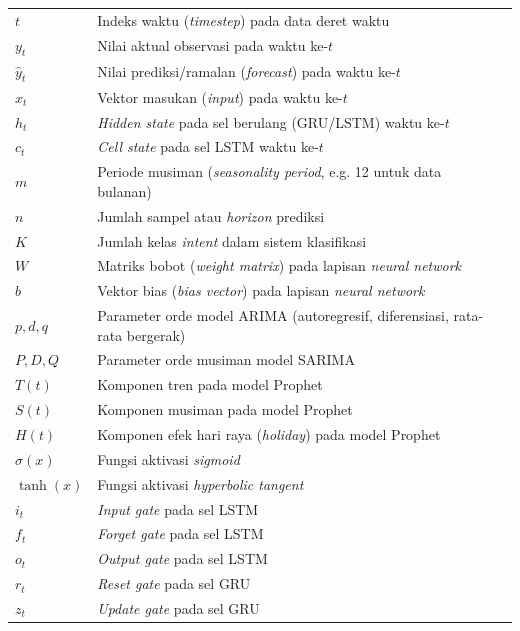 \begin{longtable}{@{} l >{\raggedright\arraybackslash}p{6.5cm} c @{}}
$t$ & Indeks waktu (\textit{timestep}) pada data deret waktu & \pageref{sym:t} \\
$y_t$ & Nilai aktual observasi pada waktu ke-$t$ & \pageref{sym:yt} \\
$\hat{y}_t$ & Nilai prediksi/ramalan (\textit{forecast}) pada waktu ke-$t$ & \pageref{sym:yhat} \\
$x_t$ & Vektor masukan (\textit{input}) pada waktu ke-$t$ & \pageref{sym:xt} \\
$h_t$ & \textit{Hidden state} pada sel berulang (GRU/LSTM) waktu ke-$t$ & \pageref{sym:ht} \\
$c_t$ & \textit{Cell state} pada sel LSTM waktu ke-$t$ & \pageref{sym:ct} \\
$m$ & Periode musiman (\textit{seasonality period}, e.g. 12 untuk data bulanan) & \pageref{sym:m} \\
$n$ & Jumlah sampel atau \textit{horizon} prediksi & \pageref{sym:n} \\
$K$ & Jumlah kelas \textit{intent} dalam sistem klasifikasi & \pageref{sym:K} \\
$W$ & Matriks bobot (\textit{weight matrix}) pada lapisan \textit{neural network} & \pageref{sym:W} \\
$b$ & Vektor bias (\textit{bias vector}) pada lapisan \textit{neural network} & \pageref{sym:b} \\
$p, d, q$ & Parameter orde model ARIMA (autoregresif, diferensiasi, rata-rata bergerak) & \pageref{sym:pdq} \\
$P, D, Q$ & Parameter orde musiman model SARIMA & \pageref{sym:PDQ} \\
$T(t)$ & Komponen tren pada model Prophet & \pageref{sym:Tt} \\
$S(t)$ & Komponen musiman pada model Prophet & \pageref{sym:St} \\
$H(t)$ & Komponen efek hari raya (\textit{holiday}) pada model Prophet & \pageref{sym:Ht} \\[1ex]


$\sigma(x)$ & Fungsi aktivasi \textit{sigmoid} & \pageref{sym:sigmoid} \\
$\tanh(x)$ & Fungsi aktivasi \textit{hyperbolic tangent} & \pageref{sym:tanh} \\
$i_t$ & \textit{Input gate} pada sel LSTM & \pageref{sym:it} \\
$f_t$ & \textit{Forget gate} pada sel LSTM & \pageref{sym:ft} \\
$o_t$ & \textit{Output gate} pada sel LSTM & \pageref{sym:ot} \\
$r_t$ & \textit{Reset gate} pada sel GRU & \pageref{sym:rt} \\
$z_t$ & \textit{Update gate} pada sel GRU & \pageref{sym:zt} \\[1ex]


\end{longtable}

